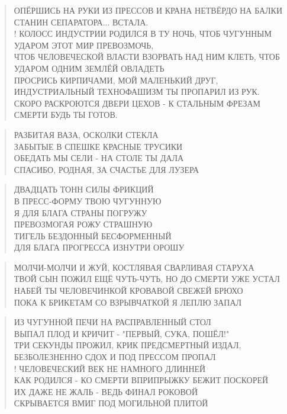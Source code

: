 \begin{verse}
ОПЁРШИСЬ НА РУКИ ИЗ ПРЕССОВ И КРАНА НЕТВЁРДО НА БАЛКИ СТАНИН СЕПАРАТОРА... ВСТАЛА.\\!
КОЛОСС ИНДУСТРИИ РОДИЛСЯ В ТУ НОЧЬ, ЧТОБ ЧУГУННЫМ УДАРОМ ЭТОТ МИР ПРЕВОЗМОЧЬ,\\
ЧТОБ ЧЕЛОВЕЧЕСКОЙ ВЛАСТИ ВЗОРВАТЬ НАД НИМ КЛЕТЬ, ЧТОБ УДАРОМ ОДНИМ ЗЕМЛЁЙ ОВЛАДЕТЬ\\
ПРОСРИСЬ КИРПИЧАМИ, МОЙ МАЛЕНЬКИЙ ДРУГ, ИНДУСТРИАЛЬНЫЙ ТЕХНОФАШИЗМ ТЫ ПРОПАРИЛ ИЗ РУК.\\
СКОРО РАСКРОЮТСЯ ДВЕРИ ЦЕХОВ - К СТАЛЬНЫМ ФРЕЗАМ СМЕРТИ БУДЬ ТЫ ГОТОВ.
\end{verse}

\poemtitle{***}
\begin{verse}
РАЗБИТАЯ ВАЗА, ОСКОЛКИ СТЕКЛА\\
ЗАБЫТЫЕ В СПЕШКЕ КРАСНЫЕ ТРУСИКИ\\
ОБЕДАТЬ МЫ СЕЛИ - НА СТОЛЕ ТЫ ДАЛА\\
СПАСИБО, РОДНАЯ, ЗА СЧАСТЬЕ ДЛЯ ЛУЗЕРА
\end{verse}

\poemtitle{***}
\begin{verse}
ДВАДЦАТЬ ТОНН СИЛЫ ФРИКЦИЙ\\
    В ПРЕСС-ФОРМУ ТВОЮ ЧУГУННУЮ\\
        Я ДЛЯ БЛАГА СТРАНЫ ПОГРУЖУ\\
ПРЕВОЗМОГАЯ РОЖУ СТРАШНУЮ\\
    ТИГЕЛЬ БЕЗДОННЫЙ БЕСФОРМЕННЫЙ\\
        ДЛЯ БЛАГА ПРОГРЕССА ИЗНУТРИ ОРОШУ
\end{verse}

\poemtitle{***}
\begin{verse}
МОЛЧИ-МОЛЧИ И ЖУЙ, КОСТЛЯВАЯ СВАРЛИВАЯ СТАРУХА\\
ТВОЙ СЫН ПОЖИЛ ЕЩЁ ЧУТЬ-ЧУТЬ, НО ДО СМЕРТИ УЖЕ УСТАЛ\\
НАБЕЙ ТЫ ЧЕЛОВЕЧИНКОЙ КРОВАВОЙ СВЕЖЕЙ БРЮХО\\
ПОКА К БРИКЕТАМ СО ВЗРЫВЧАТКОЙ Я ЛЕПЛЮ ЗАПАЛ
\end{verse}

\poemtitle{***}
\begin{verse}
ИЗ ЧУГУННОЙ ПЕЧИ НА РАСПРАВЛЕННЫЙ СТОЛ\\
ВЫПАЛ ПЛОД И КРИЧИТ - "ПЕРВЫЙ, СУКА, ПОШЁЛ!"\\
ТРИ СЕКУНДЫ ПРОЖИЛ, КРИК ПРЕДСМЕРТНЫЙ ИЗДАЛ,\\
БЕЗБОЛЕЗНЕННО СДОХ И ПОД ПРЕССОМ ПРОПАЛ\\!
ЧЕЛОВЕЧЕСКИЙ ВЕК НЕ НАМНОГО ДЛИННЕЙ\\
КАК РОДИЛСЯ - КО СМЕРТИ ВПРИПРЫЖКУ БЕЖИТ ПОСКОРЕЙ\\
ИХ ДАЖЕ НЕ ЖАЛЬ - ВЕДЬ ФИНАЛ РОКОВОЙ\\
СКРЫВАЕТСЯ ВМИГ ПОД МОГИЛЬНОЙ ПЛИТОЙ
\end{verse}

